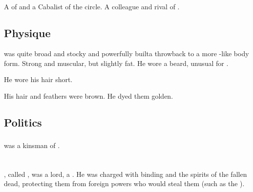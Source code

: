 \section{\Ganethed}
\index{\Ganethed}
A \thelyad{} \resphan{} of \CiriathSepher{} and a Cabalist of the \teshrialcircle circle. 
A colleague and rival of \Teshrial. 









\subsection{Physique}
\Ganethed{} was quite broad and stocky and powerfully built\dash a throwback to a more \nephil-like body form. 
Strong and muscular, but slightly fat. 
He wore a beard, unusual for \resphain. 

He wore his hair short. 

His hair and feathers were brown. 
He dyed them golden.









\subsection{Politics}





\subsubsection{\Urizeth}
\Ganethed was a kinsman of .















\section{\Harbeth}
\index{\Harbeth}
\Harbeth, called , was a \resphan{} lord, a \sathariah. 
He was charged with binding and  the spirits of the fallen dead, protecting them from foreign powers who would steal them (such as the ). 

